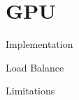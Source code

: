 \section{GPU}


\begin{frame}
	\begin{block}{Implementation}
	\end{block}
	\begin{block}{Load Balance}
	\end{block}
	\begin{block}{Limitations}
	\end{block}
\end{frame}